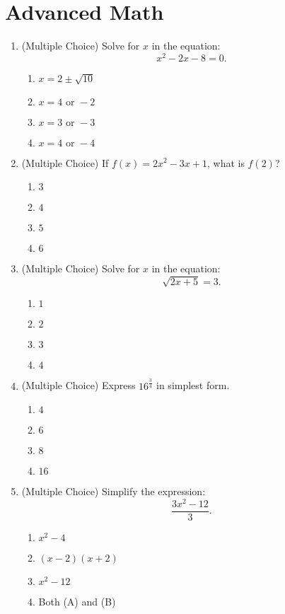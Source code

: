 \documentclass[12pt]{article}
\begin{document}
\section{Advanced Math}
\begin{enumerate}[label=\textbf{Question \arabic*:}]
  \item (Multiple Choice) Solve for \( x \) in the equation:
    \[
    x^2 - 2x - 8 = 0.
    \]
    \begin{enumerate}[label=(\Alph*)]
      \item \(x = 2 \pm \sqrt{10}\)
      \item \(x = 4 \text{ or } -2\)
      \item \(x = 3 \text{ or } -3\)
      \item \(x = 4 \text{ or } -4\)
    \end{enumerate}
    
  \item (Multiple Choice) If \( f(x)=2x^2-3x+1 \), what is \( f(2) \)?
    \begin{enumerate}[label=(\Alph*)]
      \item \(3\)
      \item \(4\)
      \item \(5\)
      \item \(6\)
    \end{enumerate}
    
  \item (Multiple Choice) Solve for \( x \) in the equation:
    \[
    \sqrt{2x+5} = 3.
    \]
    \begin{enumerate}[label=(\Alph*)]
      \item \(1\)
      \item \(2\)
      \item \(3\)
      \item \(4\)
    \end{enumerate}
    
  \item (Multiple Choice) Express \(16^{\frac{3}{4}}\) in simplest form.
    \begin{enumerate}[label=(\Alph*)]
      \item \(4\)
      \item \(6\)
      \item \(8\)
      \item \(16\)
    \end{enumerate}
    
  \item (Multiple Choice) Simplify the expression:
    \[
    \frac{3x^2-12}{3}.
    \]
    \begin{enumerate}[label=(\Alph*)]
      \item \(x^2-4\)
      \item \((x-2)(x+2)\)
      \item \(x^2-12\)
      \item Both (A) and (B)
    \end{enumerate}
    

\end{enumerate}
\end{document}
